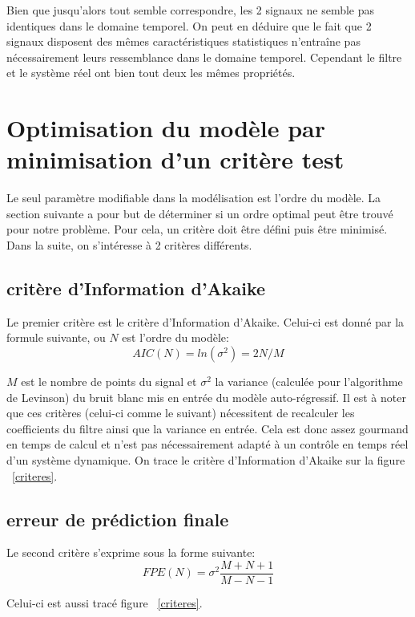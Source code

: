 \documentclass[a4paper]{article}
\begin{document}
Bien que jusqu'alors tout semble correspondre, les 2 signaux ne semble pas identiques dans le domaine temporel. On peut en déduire que le fait que 2 signaux disposent des mêmes caractéristiques statistiques n'entraîne pas nécessairement leurs ressemblance dans le domaine temporel. Cependant le filtre et le système réel ont bien tout deux les mêmes propriétés. 

\section{Optimisation du modèle par minimisation d'un critère test}
Le seul paramètre modifiable dans la modélisation est l'ordre du modèle. La section suivante a pour but de déterminer si un ordre optimal peut être trouvé pour notre problème. Pour cela, un critère doit être défini puis être minimisé. Dans la suite, on s'intéresse à 2 critères différents.


\subsection{critère d'Information d'Akaike}
Le premier critère est le critère d'Information d'Akaike. Celui-ci est donné par la formule suivante, ou $N$ est l'ordre du modèle:
\begin{equation}
AIC(N) = ln(\sigma ^2) = 2 N/M
\end{equation}

$M$ est le nombre de points du signal et $\sigma ^2$ la variance (calculée pour l'algorithme de Levinson) du bruit blanc mis en entrée du modèle auto-régressif. Il est à noter que ces critères (celui-ci comme le suivant) nécessitent de recalculer les coefficients du filtre ainsi que la variance en entrée. Cela est donc assez gourmand en temps de calcul et n'est pas nécessairement adapté à un contrôle en temps réel d'un système dynamique.
On trace le critère d'Information d'Akaike sur la figure ~\ref{criteres}.

\subsection{erreur de prédiction finale}
Le second critère s'exprime sous la forme suivante:
\begin{equation}
FPE(N) = \sigma ^2 \frac{M+N+1}{M-N-1}
\end{equation}

Celui-ci est aussi tracé figure ~\ref{criteres}.
\end{document}

